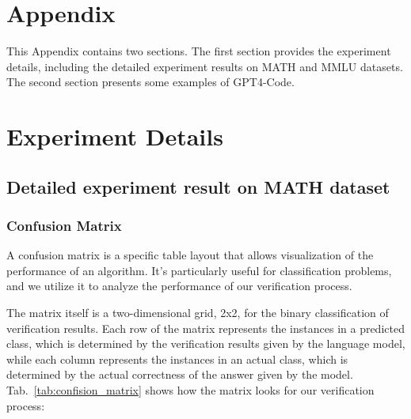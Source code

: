\documentclass{article} \usepackage{iclr2023_conference,times}
\newcommand{\gptcode}{GPT4-Code}
\begin{document}
\newpage


\newpage
\appendix

\section*{Appendix}

This Appendix contains two sections. The first section provides the experiment details, including the detailed experiment results on MATH and MMLU datasets. The second section presents some examples of \gptcode.


\section{Experiment Details}

\subsection{Detailed experiment result on MATH dataset}
\subsubsection{Confusion Matrix}
\label{sec:conf}
A confusion matrix is a specific table layout that allows visualization of the performance of an algorithm. It's particularly useful for classification problems, and we utilize it to analyze the performance of our verification process.

The matrix itself is a two-dimensional grid, 2x2, for the binary classification of verification results. Each row of the matrix represents the instances in a predicted class, which is determined by the verification results given by the language model, while each column represents the instances in an actual class, which is determined by the actual correctness of the answer given by the model. Tab.~\ref{tab:confision_matrix} shows how the matrix looks for our verification process:
\end{document}
